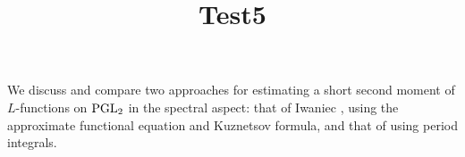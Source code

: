 \documentclass[reqno]{amsart} 
\title{Test5}
\numberwithin{equation}{section}
\numberwithin{theorem}{section}
\begin{document}
\maketitle
\tableofcontents


We discuss and compare two approaches for estimating a short second moment of $L$-functions on $\operatorname{PGL}_2$ in the spectral aspect: that of Iwaniec \cite{Iwaniec1992}, using the approximate functional equation and Kuznetsov formula, and that of \cite{2021arXiv210915230N} using period integrals.




{} 
\end{document}
